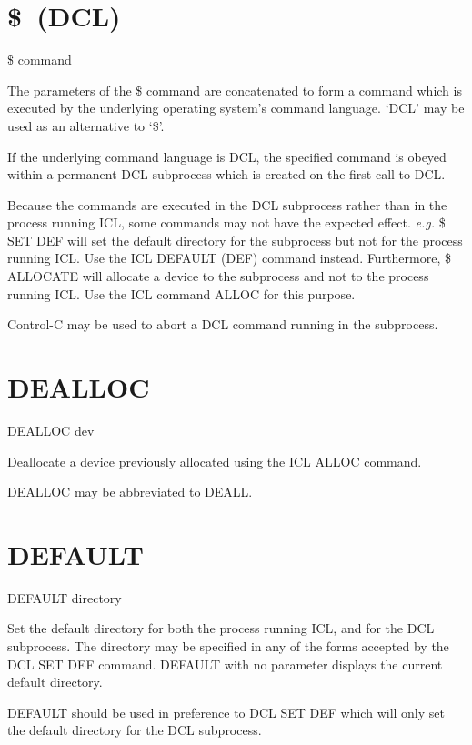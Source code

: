 \section{\$\ (DCL)}                          

   \$ command

 The parameters of the \$ command are concatenated to form a command which is
 executed by the underlying operating system's command language. 
 `DCL' may be used as an alternative to `\$'.

 If the underlying command language is DCL, the specified command is obeyed 
 within a permanent DCL subprocess which is created on the first call to DCL.

 Because the commands are executed in the DCL subprocess rather than in the
 process running ICL, some commands may not have the expected effect. 
 {\em e.g.} \$ SET DEF will set the default directory for the subprocess but not
 for the process running ICL. Use the ICL DEFAULT (DEF) command instead.
 Furthermore, \$ ALLOCATE will allocate a device to the subprocess and not to
 the process running ICL. Use the ICL command ALLOC for this purpose.

 Control-C may be used to abort a DCL command running in the subprocess.

\section{DEALLOC}

   DEALLOC \hspace{.5cm} dev 

 Deallocate a device previously allocated using the ICL ALLOC command.

 DEALLOC may be abbreviated to DEALL.

\section{DEFAULT}

   DEFAULT \hspace{.5cm} directory

 Set the default directory for both the process running ICL, and for the
 DCL subprocess. The directory may be specified in any of the forms
 accepted by the DCL  SET DEF command. DEFAULT with no parameter
 displays the current default directory.

 DEFAULT should be used in preference to DCL SET DEF which will only
 set the default directory for the DCL subprocess.

